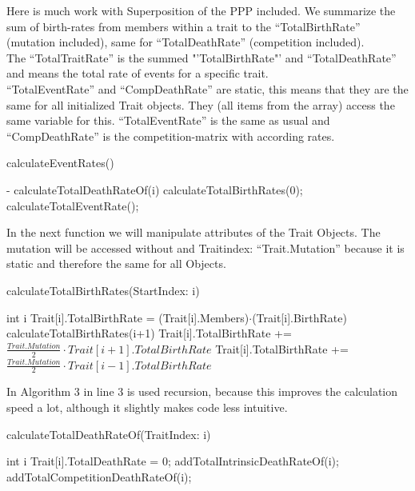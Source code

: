 \documentclass{article}
\begin{document}
Here is much work with Superposition of the PPP included. We summarize the sum of birth-rates from members within a trait to the "`TotalBirthRate"' (mutation included), same for "`TotalDeathRate"' (competition included). \\
The "`TotalTraitRate"' is the summed  "'TotalBirthRate"' and "`TotalDeathRate"' and means the total rate of events for a specific trait. \\
"`TotalEventRate"' and "`CompDeathRate"' are static, this means that they are the same for all initialized Trait objects. They (all items from the array) access the same variable for this. "`TotalEventRate"' is the same as usual and "`CompDeathRate"' is the competition-matrix with according rates.\\	
\begin{algorithm}[H]
	\caption{calculateEventRates()}
	\begin{algorithmic}[1]
		\REQUIRE -
			\STATE calculateTotalDeathRateOf(i)
		\ENDFOR
		\STATE calculateTotalBirthRates(0);
		\STATE calculateTotalEventRate();
	\end{algorithmic}
\end{algorithm}
In the next function we will manipulate attributes of the Trait Objects. The mutation will be accessed without and Traitindex: "`Trait.Mutation"' because it is static and therefore the same for all Objects.
\begin{algorithm}[H]
	\caption{calculateTotalBirthRates(StartIndex: i)}
	\begin{algorithmic}[1]
		\REQUIRE int i
		\STATE Trait[i].TotalBirthRate = (Trait[i].Members)$\cdot$(Trait[i].BirthRate)
			\STATE calculateTotalBirthRates(i+1)
			\STATE Trait[i].TotalBirthRate += $\frac{Trait.Mutation}{2}\cdot Trait[i+1].TotalBirthRate $
		\ENDIF
			\STATE Trait[i].TotalBirthRate += $\frac{Trait.Mutation}{2}\cdot Trait[i-1].TotalBirthRate $
		\ENDIF
	\end{algorithmic}
\end{algorithm}
In Algorithm 3 in line 3 is used recursion, because this improves the calculation speed a lot, although it slightly makes code less intuitive.

\begin{algorithm}[H][H]
	\caption{calculateTotalDeathRateOf(TraitIndex: i)}
	\begin{algorithmic}[1]
		\REQUIRE int i
		\STATE Trait[i].TotalDeathRate = 0;
		\STATE addTotalIntrinsicDeathRateOf(i);
		\STATE addTotalCompetitionDeathRateOf(i);
	\end{algorithmic}
\end{algorithm}
\end{document}
